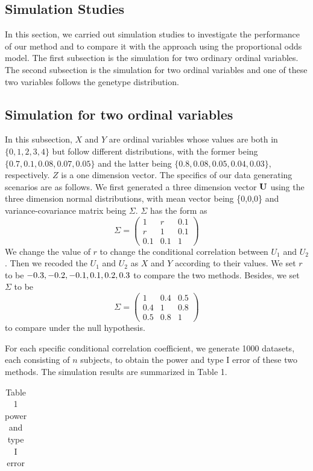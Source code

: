 \documentclass[a4,11pt,epsf, amssymb]{article}
\begin{document}
\begin{CJK}{GBK}{song}
\section{Simulation Studies}

In this section, we carried out simulation studies to investigate the performance of our method and to compare it with the approach using the proportional odds model. The first subsection is the simulation for two ordinary ordinal variables. The second subsection is the simulation for two ordinal variables and one of these two variables follows the genetype distribution.
\subsection{Simulation for two ordinal variables}

In this subsection, $X$ and $Y$ are ordinal variables whose values are both in $\{0,1,2,3,4\}$ but follow different distributions, with the former being $\{0.7,0.1,0.08,0.07,0.05\}$ and the latter being $\{0.8,0.08,0.05,0.04,0.03\}$, respectively. $Z$ is a one dimension vector.
The specifics of our data generating scenarios are as follows. We first generated a three dimension vector ${\bf U}$ using the three dimension normal distributions, with mean vector being \{0,0,0\} and variance-covariance matrix being $\Sigma$. $\Sigma$ has the form as
$$\Sigma = \left( \begin{array}{ccc} 1 & r & 0.1 \\ r & 1 & 0.1 \\ 0.1 & 0.1 & 1 \end{array} \right)$$
We change the value of $r$ to change the conditional correlation between $U_1$ and $U_2$. Then we recoded the $U_1$ and $U_2$ as $X$ and $Y$ according to their values.
We set $r$ to be $-0.3, -0.2, -0.1, \\ 0.1, 0.2, 0.3$ to compare the two methods. Besides, we set $\Sigma$ to be
$$\Sigma = \left( \begin{array}{ccc} 1 & 0.4 & 0.5 \\ 0.4 & 1 & 0.8 \\ 0.5 & 0.8 & 1 \end{array} \right)$$
to compare under the null hypothesis.

For each specific conditional correlation coefficient, we generate 1000 datasets, each consisting of $n$ subjects, to obtain the power and type I error of these two methods. The simulation results are summarized in Table 1.\\
\begin{table}
\caption{Table 1 power and type I error}
\begin{tabular}{|c|c|c|c|c|c|c|c|c|c|c|c|c|c|c|}


\end{tabular}
\end{table}
\end{CJK}
\end{document}
